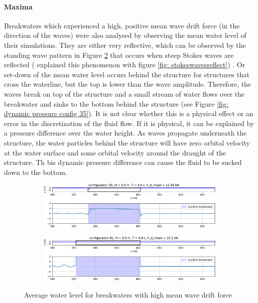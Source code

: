 \paragraph{Maxima}
Breakwaters which experienced a high, positive mean wave drift force (in the direction of the waves) were also analysed by observing the mean water level of their simulations. They are either very reflective, which can be observed by the standing wave pattern in Figure \ref{fig: average waterlevel config91 reflective} that occurs when steep Stokes waves are reflected (\citet{maris} explained this phenomenon with figure \ref{fig: stokeswavesreflect}) . Or set-down of the mean water level occurs behind the structure for structures that cross the waterline, but the top is lower than the wave amplitude. Therefore, the waves break on top of the structure and a small stream of water flows over the breakwater and sinks to the bottom behind the structure (see Figure \ref{fig: dynamic pressure config 35}). It is not clear whether this is a physical effect or an error in the discretization of the fluid flow. If it is physical, it can be explained by a pressure difference over the water height. As waves propagate underneath the structure, the water particles behind the structure will have zero orbital velocity at the water surface and some orbital velocity around the draught of the structure. Th bis dynamic pressure difference can cause the fluid to be sucked down to the bottom. 

\begin{figure}[h]
    \centering
    \begin{subfigure}[b]{0.49\textwidth}
        \centering
        \includegraphics[width=\textwidth]{figures/ComFLOW/Results average wl/configuration35.pdf}
        \caption[]%
        {{\small }}    
        \label{fig: average waterlevel config35 setdown behind}
    \end{subfigure}
    \hfill
    \begin{subfigure}[b]{0.49\textwidth}   
        \centering 
        \includegraphics[width=\textwidth]{figures/ComFLOW/Results average wl/configuration91.pdf}
        \caption[]%
        {{\small }}    
        \label{fig: average waterlevel config91 reflective}
    \end{subfigure}


    \caption{Average water level for breakwaters with high mean wave drift force}
    \label{}
\end{figure}





